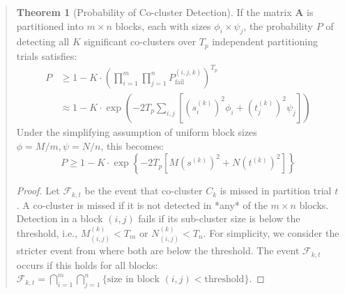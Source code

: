 \documentclass{ar2rc}
\theoremstyle{definition}
\newtheorem*{theorem*}{Theorem}
\theoremstyle{remark} %
\begin{document}
\begin{quote}
  \begin{theorem*}[Probability of Co-cluster Detection]
    If the matrix $\mathbf{A}$ is partitioned into $m \times n$ blocks, each with sizes $\phi_i \times \psi_j$, the probability $P$ of detecting all $K$ significant co-clusters over $T_p$ independent partitioning trials satisfies:
    \begin{equation}
      \begin{aligned}
        P & \geq 1 - K \cdot \left(\prod_{i=1}^m \prod_{j=1}^n P_\text{fail}^{(i,j,k)}\right)^{T_p}                             \\
          & \approx 1 - K \cdot \exp\left( -2 T_p \sum_{i,j} \left[ (s_i^{(k)})^2 \phi_i + (t_j^{(k)})^2 \psi_j \right] \right)
      \end{aligned}
    \end{equation}
    Under the simplifying assumption of uniform block sizes $\phi = M/m, \psi=N/n$, this becomes:
    \begin{equation}
      P \geq 1 - K \cdot \exp \left\{ -2 T_p \left[ M (s^{(k)})^2 + N (t^{(k)})^2 \right] \right\}
    \end{equation}
  \end{theorem*}


  \begin{proof}
    Let $\mathcal{F}_{k,t}$ be the event that co-cluster $C_k$ is missed in partition trial $t$. A co-cluster is missed if it is not detected in *any* of the $m \times n$ blocks. Detection in a block $(i,j)$ fails if its sub-cluster size is below the threshold, i.e., $M_{(i,j)}^{(k)} < T_m$ or $N_{(i,j)}^{(k)} < T_n$. For simplicity, we consider the stricter event from  where both are below the threshold. The event $\mathcal{F}_{k,t}$ occurs if this holds for all blocks: $\mathcal{F}_{k,t} = \bigcap_{i=1}^m \bigcap_{j=1}^n \{\text{size in block }(i,j) < \text{threshold}\}$.


\end{proof}
\end{quote}
\end{document}
